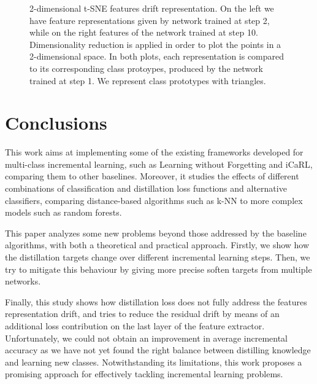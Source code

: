 \documentclass[10pt,twocolumn,letterpaper]{article}
\begin{document}
\begin{figure*}
\begin{center}
\begin{subfigure}{0.48\textwidth}
\end{subfigure}
\end{center}
\caption{2-dimensional t-SNE features drift representation. On the left we have feature representations given by network trained at step 2, while on the right features of the network trained at step 10. Dimensionality reduction is applied in order to plot the points in a 2-dimensional space. In both plots, each representation is compared to its corresponding class protoypes, produced by the network trained at step 1. We represent class prototypes with triangles.}

\label{5:tsne}
\end{figure*}

\section{Conclusions}
This work aims at implementing some of the existing frameworks developed for multi-class incremental learning, such as Learning without Forgetting and iCaRL, comparing them to other baselines. Moreover, it studies the effects of different combinations of classification and distillation loss functions and alternative classifiers, comparing distance-based algorithms such as k-NN to more complex models such as random forests.

This paper analyzes some new problems beyond those addressed by the baseline algorithms, with both a theoretical and practical approach. Firstly, we show how the distillation targets change over different incremental learning steps. Then, we try to mitigate this behaviour by giving more precise soften targets from multiple networks.

Finally, this study shows how distillation loss does not fully address the features representation drift, and tries to reduce the residual drift by means of an additional loss contribution on the last layer of the feature extractor. Unfortunately, we could not obtain an improvement in average incremental accuracy as we have not yet found the right balance between distilling knowledge and learning new classes. Notwithstanding its limitations, this work proposes a promising approach for effectively tackling incremental learning problems.
\end{document}
